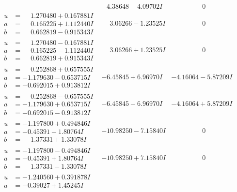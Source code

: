 \documentclass[1p]{elsarticle_modified}
\theoremstyle{definition}
\begin{document}
$$\begin{array}{c|c|c}
 & -4.38648 - 4.09702 I & \phantom{-0.000000 } 0 \\ \hline\begin{aligned}
u &= \phantom{-}1.270480 + 0.167881 I \\
a &= \phantom{-}0.165225 + 1.112440 I \\
b &= \phantom{-}0.662819 - 0.915343 I\end{aligned}
 & \phantom{-}3.06266 - 1.23525 I & \phantom{-0.000000 } 0 \\ \hline\begin{aligned}
u &= \phantom{-}1.270480 - 0.167881 I \\
a &= \phantom{-}0.165225 - 1.112440 I \\
b &= \phantom{-}0.662819 + 0.915343 I\end{aligned}
 & \phantom{-}3.06266 + 1.23525 I & \phantom{-0.000000 } 0 \\ \hline\begin{aligned}
u &= \phantom{-}0.252868 + 0.657555 I \\
a &= -1.179630 - 0.653715 I \\
b &= -0.692015 + 0.913812 I\end{aligned}
 & -6.45845 + 6.96970 I & -4.16064 - 5.87209 I \\ \hline\begin{aligned}
u &= \phantom{-}0.252868 - 0.657555 I \\
a &= -1.179630 + 0.653715 I \\
b &= -0.692015 - 0.913812 I\end{aligned}
 & -6.45845 - 6.96970 I & -4.16064 + 5.87209 I \\ \hline\begin{aligned}
u &= -1.197800 + 0.494846 I \\
a &= -0.45391 - 1.80764 I \\
b &= \phantom{-}1.37331 + 1.33078 I\end{aligned}
 & -10.98250 - 7.15840 I & \phantom{-0.000000 } 0 \\ \hline\begin{aligned}
u &= -1.197800 - 0.494846 I \\
a &= -0.45391 + 1.80764 I \\
b &= \phantom{-}1.37331 - 1.33078 I\end{aligned}
 & -10.98250 + 7.15840 I & \phantom{-0.000000 } 0 \\ \hline\begin{aligned}
u &= -1.240560 + 0.391878 I \\
a &= -0.39027 + 1.45245 I \\

\end{aligned}
\end{array}$$
\end{document}
